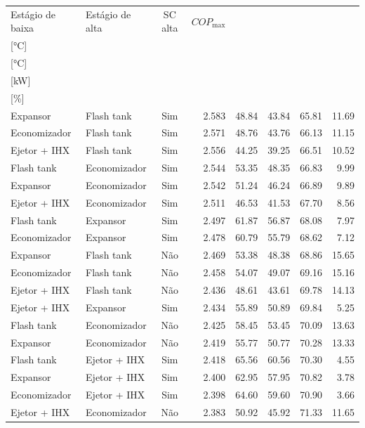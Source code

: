 {\small\setlength{\tabcolsep}{4pt}\renewcommand{\arraystretch}{1.12}
\begin{tabular}{llcrrrrr}
\toprule
Estágio de baixa & Estágio de alta & SC alta & $COP_{\max}$ & \shortstack{$T_{\mathrm{cond,l}}^*$\\{[°C]}} & \shortstack{$T_{\mathrm{evap,h}}^*$\\{[°C]}} & \shortstack{$\dot W_{\mathrm{liq}}$\\{[kW]}} & \shortstack{$\Delta COP_{\mathrm{opt}}$\\{[\%]}} \\
\midrule
Expansor & Flash tank & Sim & 2.583 & 48.84 & 43.84 & 65.81 & 11.69 \\
Economizador & Flash tank & Sim & 2.571 & 48.76 & 43.76 & 66.13 & 11.15 \\
Ejetor + IHX & Flash tank & Sim & 2.556 & 44.25 & 39.25 & 66.51 & 10.52 \\
Flash tank & Economizador & Sim & 2.544 & 53.35 & 48.35 & 66.83 & 9.99 \\
Expansor & Economizador & Sim & 2.542 & 51.24 & 46.24 & 66.89 & 9.89 \\
Ejetor + IHX & Economizador & Sim & 2.511 & 46.53 & 41.53 & 67.70 & 8.56 \\
Flash tank & Expansor & Sim & 2.497 & 61.87 & 56.87 & 68.08 & 7.97 \\
Economizador & Expansor & Sim & 2.478 & 60.79 & 55.79 & 68.62 & 7.12 \\
Expansor & Flash tank & Não & 2.469 & 53.38 & 48.38 & 68.86 & 15.65 \\
Economizador & Flash tank & Não & 2.458 & 54.07 & 49.07 & 69.16 & 15.16 \\
Ejetor + IHX & Flash tank & Não & 2.436 & 48.61 & 43.61 & 69.78 & 14.13 \\
Ejetor + IHX & Expansor & Sim & 2.434 & 55.89 & 50.89 & 69.84 & 5.25 \\
Flash tank & Economizador & Não & 2.425 & 58.45 & 53.45 & 70.09 & 13.63 \\
Expansor & Economizador & Não & 2.419 & 55.77 & 50.77 & 70.28 & 13.33 \\
Flash tank & Ejetor + IHX & Sim & 2.418 & 65.56 & 60.56 & 70.30 & 4.55 \\
Expansor & Ejetor + IHX & Sim & 2.400 & 62.95 & 57.95 & 70.82 & 3.78 \\
Economizador & Ejetor + IHX & Sim & 2.398 & 64.60 & 59.60 & 70.90 & 3.66 \\
Ejetor + IHX & Economizador & Não & 2.383 & 50.92 & 45.92 & 71.33 & 11.65 \\

\end{tabular}}
